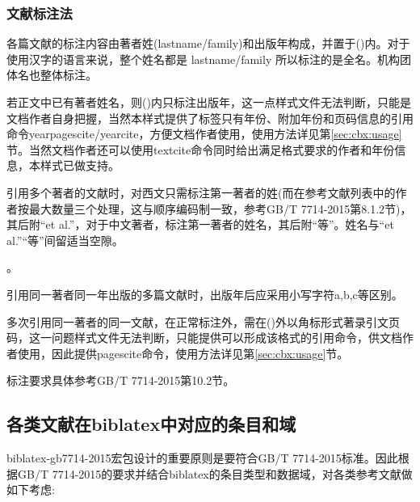 \subsubsection{文献标注法}
各篇文献的标注内容由著者姓(lastname/family)和出版年构成，并置于()内。对于使用汉字的语言来说，整个姓名都是 lastname/family 所以标注的是全名。机构团体名也整体标注。

若正文中已有著者姓名，则()内只标注出版年，这一点样式文件无法判断，只能是文档作者自身把握，当然本样式提供了标签只有年份、附加年份和页码信息的引用命令yearpagescite/yearcite，方便文档作者使用，使用方法详见第\ref{sec:cbx:usage}节。当然文档作者还可以使用textcite命令同时给出满足格式要求的作者和年份信息，本样式已做支持。

引用多个著者的文献时，对西文只需标注第一著者的姓(而在参考文献列表中的作者按最大数量三个处理，这与顺序编码制一致，参考GB/T 7714-2015第8.1.2节)，其后附“et al.”，对于中文著者，标注第一著者的姓名，其后附“等”。姓名与“et al.”“等”间留适当空隙。

。

引用同一著者同一年出版的多篇文献时，出版年后应采用小写字符a,b,c等区别。

多次引用同一著者的同一文献，在正常标注外，需在()外以角标形式著录引文页码，这一问题样式文件无法判断，只能提供可以形成该格式的引用命令，供文档作者使用，因此提供pagescite命令，使用方法详见第\ref{sec:cbx:usage}节。

标注要求具体参考GB/T 7714-2015第10.2节。



\subsection{各类文献在biblatex中对应的条目和域}\label{sec:numeric:data}
biblatex-gb7714-2015宏包设计的重要原则是要符合GB/T 7714-2015标准。因此根据GB/T 7714-2015的要求并结合biblatex的条目类型和数据域，对各类参考文献做如下考虑:
